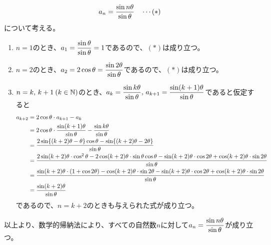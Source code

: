 \documentclass[a4paper]{ltjsarticle}
\begin{document}
\begin{ans*}
  ${}$
  \begin{gather*}
    a_{n} = \frac{\sin n{\theta}}{\sin{\theta}} \quad\cdots\mathrm{(*)}
  \end{gather*}
  について考える。
  \begin{enumerate}[label=(\roman*), ref=(\roman*), itemsep=0pt]
    \item $n=1$のとき、$\displaystyle a_{1} = \frac{\sin{\theta}}{\sin{\theta}}=1$であるので、$(*)$は成り立つ。
    \item $n=2$のとき、$\displaystyle a_{2} = 2\cos{\theta} = \frac{\sin 2{\theta}}{\sin{\theta}}$であるので、$(*)$は成り立つ。
    \item $n=k,\,k+1\:(k\in\mathbb{N})$のとき、$\displaystyle a_{k} = \frac{\sin k{\theta}}{\sin{\theta}},\,a_{k+1} = \frac{\sin (k+1){\theta}}{\sin{\theta}}$であると仮定すると
    \begin{align*}
      a_{k+2}
      &= 2\cos{\theta}\cdot a_{k+1} - a_{k} \\
      &= 2\cos{\theta}\cdot \frac{\sin (k+1){\theta}}{\sin{\theta}} - \frac{\sin k{\theta}}{\sin{\theta}} \\
      &= \frac{ 2\sin\{ (k+2){\theta} - {\theta} \}\cos{\theta} - \sin \{ (k+2){\theta} - 2{\theta} \}}{\sin{\theta}} \\
      &= \frac{
        2\sin(k+2){\theta} \cdot \cos^{2}{\theta}
        - 2\cos(k+2){\theta} \cdot \sin{\theta}\cos{\theta}
        - \sin(k+2){\theta} \cdot \cos 2{\theta}
        + \cos(k+2){\theta} \cdot \sin 2{\theta}
      }{
        \sin{\theta}
      } \\
      &= \frac{
        \sin(k+2){\theta} \cdot (1+\cos 2{\theta})
        - \cos(k+2){\theta} \cdot \sin2{\theta}
        - \sin(k+2){\theta} \cdot \cos 2{\theta}
        + \cos(k+2){\theta} \cdot \sin 2{\theta}
      }{
        \sin{\theta}
      } \\
      &= \frac{\sin (k+2){\theta}}{\sin{\theta}}
      \end{align*}
    であるので、$n=k+2$のときも与えられた式が成り立つ。
  \end{enumerate}
  以上より、数学的帰納法により、すべての自然数$n$に対して$\displaystyle a_{n} = \frac{\sin n{\theta}}{\sin{\theta}}$が成り立つ。
\end{ans*}
\end{document}
